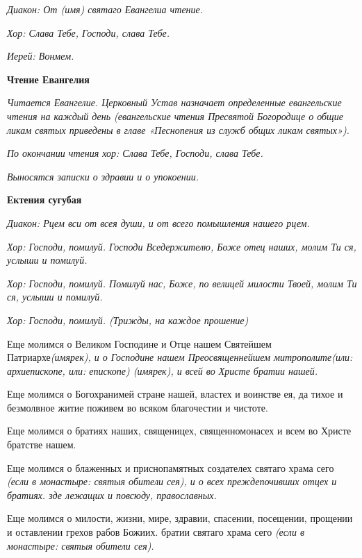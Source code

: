 \itshape Диакон:\normalfont{} От \itshape (имя\normalfont{}) святаго Евангелиа чтение.


\itshape Хор\normalfont{}: Слава Тебе, Господи, слава Тебе.


\itshape Иерей:\normalfont{} Вонмем.


\medskip
\bfseries Чтение Евангелия\normalfont{}\nopagebreak


\itshape Читается Евангелие. Церковный Устав назначает определенные евангельские чтения на каждый день (евангельские чтения Пресвятой Богородице о общие ликам святых приведены в главе «Песнопения из служб общих ликам святых»).\normalfont{}


\itshape По окончании чтения хор:\normalfont{} Слава Тебе, Господи, слава Тебе.


\itshape Выносятся записки о здравии и о упокоении.\normalfont{}


\medskip
\bfseries Ектения сугубая\normalfont{}\nopagebreak


\itshape Диакон:\normalfont{} Рцем вси от всея души, и от всего помышления нашего рцем.


\itshape  Хор:\normalfont{} Господи, помилуй. Господи Вседержителю, Боже отец наших, молим Ти ся, услыши и помилуй.


\itshape  Хор:\normalfont{} Господи, помилуй. Помилуй нас, Боже, по велицей милости Твоей, молим Ти ся, услыши и помилуй.


\itshape  Хор:\normalfont{} Господи, помилуй. \itshape (Трижды, на каждое прошение)\normalfont{} 


Еще молимся о Великом Господине и Отце нашем Святейшем Патриархе\itshape  (имярек)\normalfont{}, и о Господине нашем Преосвященнейшем митрополите\itshape  (или:\normalfont{} архиепископе\itshape , или:\normalfont{} епископе\itshape ) (имярек)\normalfont{}, и всей во Христе братии нашей. 


Еще молимся о Богохранимей стране нашей, властех и воинстве ея, да тихое и безмолвное житие поживем во всяком благочестии и чистоте. 


Еще молимся о братиях наших, священицех, священномонасех и всем во Христе братстве нашем.


Еще молимся о блаженных и приснопамятных создателех святаго храма сего \itshape (если в монастыре:\normalfont{} святыя обители сея), и о всех преждепочивших отцех и братиях. зде лежащих и повсюду, православных. 


Еще молимся о милости, жизни, мире, здравии, спасении, посещении, прощении и оставлении грехов рабов Божиих. братии святаго храма сего \itshape (если в монастыре:\normalfont{} святыя обители сея). 


